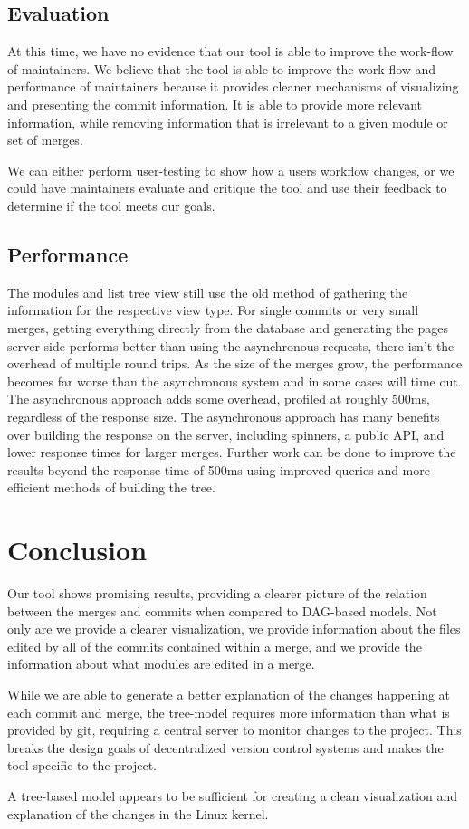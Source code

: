 \documentclass[conference, draftclsnofoot]{IEEEtran}
\begin{document}
\subsection{Evaluation}
At this time, we have no evidence that our tool is able to improve the
work-flow of maintainers. We believe that the tool is able to improve the
work-flow and performance of maintainers because it provides cleaner mechanisms
of visualizing and presenting the commit information. It is able to provide
more relevant information, while removing information that is irrelevant to a
given module or set of merges.

We can either perform user-testing to show how a users workflow changes, or we
could have maintainers evaluate and critique the tool and use their feedback to
determine if the tool meets our goals.

\subsection{Performance}
The modules and list tree view still use the old method of gathering the
information for the respective view type. For single commits or very small
merges, getting everything directly from the database and generating the pages
server-side performs better than using the asynchronous requests, there
isn't the overhead of multiple round trips. As the size of the merges grow,
the performance becomes far worse than the asynchronous system and in some
cases will time out. The asynchronous approach adds some overhead, profiled at
roughly 500ms, regardless of the response size. The asynchronous approach has
many benefits over building the response on the server, including spinners, a
public API, and lower response times for larger merges. Further work can be
done to improve the results beyond the response time of 500ms using improved
queries and more efficient methods of building the tree.\newpage
\section{Conclusion}
Our tool shows promising results, providing a clearer picture of the relation
between the merges and commits when compared to DAG-based models. Not only are
we provide a clearer visualization, we provide information about the files
edited by all of the commits contained within a merge, and we provide the
information about what modules are edited in a merge.

While we are able to generate a better explanation of the changes happening at
each commit and merge, the tree-model requires more information than what is
provided by git, requiring a central server to monitor changes to the project.
This breaks the design goals of decentralized version control systems and makes
the tool specific to the project.

A tree-based model appears to be sufficient for creating a clean visualization
and explanation of the changes in the Linux kernel.

\nocite{*}


\end{document}
